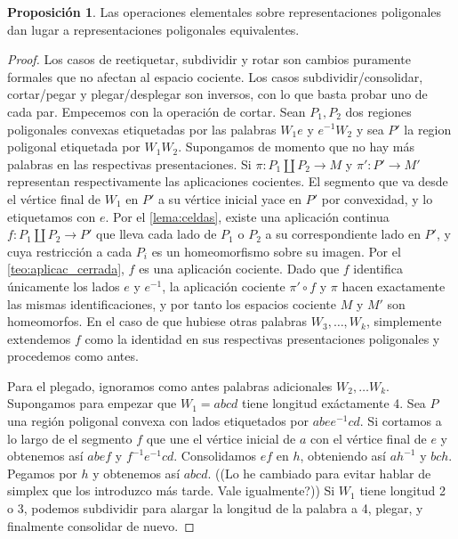 \documentclass[10pt]{report}
\theoremstyle{definition}
\newtheorem{prop}[defin]{Proposición}
\begin{document}
\begin{prop}%
Las operaciones elementales sobre representaciones poligonales dan lugar a representaciones poligonales equivalentes.
\end{prop}
\begin{proof}
Los casos de reetiquetar, subdividir y rotar son cambios puramente formales que no afectan al espacio cociente. Los casos subdividir/consolidar, cortar/pegar y plegar/desplegar son inversos, con lo que basta probar uno de cada par. 
Empecemos con la operación de cortar. Sean $P_1, P_2$ dos regiones poligonales convexas etiquetadas por las palabras $W_1e$ y $e^{-1}W_2$ y sea $P'$ la region poligonal etiquetada por $W_1 W_2$. Supongamos de momento que no hay más palabras en las respectivas presentaciones. Si $\pi :P_1\amalg P_2\to M$ y $\pi' :P'\to M'$ representan respectivamente las aplicaciones cocientes. El segmento que va desde el vértice final de $W_1$ en $P'$ a su vértice inicial yace en $P'$ por convexidad, y lo etiquetamos con $e$. Por el \autoref{lema:celdas}, existe una aplicación continua $f:P_1\amalg P_2\to P'$ que lleva cada lado de $P_1$ o $P_2$ a su correspondiente lado en $P'$, y cuya restricción a cada $P_i$ es un homeomorfismo sobre su imagen. Por el \autoref{teo:aplicac_cerrada}, $f$ es una aplicación cociente. Dado que $f$ identifica únicamente los lados $e$ y $e^{-1}$, la aplicación cociente $\pi '\circ f$ y $\pi$ hacen exactamente las mismas identificaciones, y por tanto los espacios cociente $M$ y $M'$ son homeomorfos. 
En el caso de que hubiese otras palabras $W_3,\dots ,W_k$, simplemente extendemos $f$ como la identidad en sus respectivas presentaciones poligonales y procedemos como antes.

Para el plegado, ignoramos como antes palabras adicionales $W_2,\dots W_k$. Supongamos para empezar que $W_1=abcd$ tiene longitud exáctamente 4. Sea $P$ una región poligonal convexa con lados etiquetados por $abee^{-1}cd$. Si cortamos a lo largo de el segmento $f$ que une el vértice inicial de $a$ con el vértice final de $e$ y obtenemos así $abef$ y $f^{-1}e^{-1}cd$. Consolidamos $ef$ en $h$, obteniendo así $ah^{-1}$ y $bch$. Pegamos por $h$ y obtenemos así $abcd$. ((Lo he cambiado para evitar hablar de simplex que los introduzco más tarde. Vale igualmente?))
Si $W_1$ tiene longitud 2 o 3, podemos subdividir para alargar la longitud de la palabra a 4, plegar, y finalmente consolidar de nuevo.
\end{proof}
\end{document}
